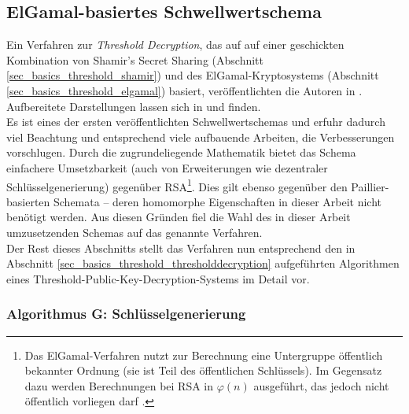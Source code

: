 \subsection{ElGamal-basiertes Schwellwertschema}

\label{sec_state_threshold_scheme}

Ein Verfahren zur \textit{Threshold Decryption}, das auf auf einer geschickten Kombination von Shamir's Secret Sharing (Abschnitt \ref{sec_basics_threshold_shamir}) und des ElGamal-Kryptosystems (Abschnitt \ref{sec_basics_threshold_elgamal}) basiert, veröffentlichten die Autoren in \cite{DesmedtFrankel1990}. Aufbereitete Darstellungen lassen sich in \cite{katz2014} und \cite{boneh2016} finden. \\
Es ist eines der ersten veröffentlichten Schwellwertschemas und erfuhr dadurch viel Beachtung und entsprechend viele aufbauende Arbeiten, die Verbesserungen vorschlugen. Durch die zugrundeliegende Mathematik bietet das Schema einfachere Umsetzbarkeit (auch von Erweiterungen wie dezentraler Schlüsselgenerierung) gegenüber RSA\footnote{
  Das ElGamal-Verfahren nutzt zur Berechnung eine Untergruppe öffentlich bekannter Ordnung (sie ist Teil des öffentlichen Schlüssels). Im Gegensatz dazu werden Berechnungen bei RSA in \(\varphi(n)\) ausgeführt, das jedoch nicht öffentlich vorliegen darf \cite{nguyen2005}.
}. Dies gilt ebenso gegenüber den Paillier-basierten Schemata -- deren homomorphe Eigenschaften in dieser Arbeit nicht benötigt werden. Aus diesen Gründen fiel die Wahl des in dieser Arbeit umzusetzenden Schemas auf das genannte Verfahren.\\
Der Rest dieses Abschnitts stellt das Verfahren nun entsprechend den in Abschnitt \ref{sec_basics_threshold_thresholddecryption} aufgeführten Algorithmen eines Threshold-Public-Key-Decryption-Systems im Detail vor.





\subsubsection*{Algorithmus G: Schlüsselgenerierung}

